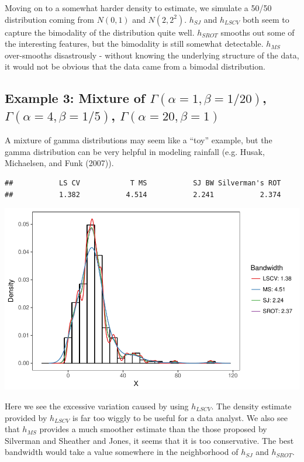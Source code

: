 \documentclass[]{article}
\begin{document}
Moving on to a somewhat harder density to estimate, we simulate a 50/50
distribution coming from \(N(0,1)\) and \(N(2, 2^2)\). \(h_{SJ}\) and
\(h_{LSCV}\) both seem to capture the bimodality of the distribution
quite well. \(h_{SROT}\) smooths out some of the interesting features,
but the bimodality is still somewhat detectable. \(h_{MS}\) over-smooths
disastrously - without knowing the underlying structure of the data, it
would not be obvious that the data came from a bimodal distribution.

\newpage

\subsection{Example 3: Mixture of $\Gamma(\alpha = 1, \beta = 1/20)$, $\Gamma(\alpha = 4, \beta = 1/5)$, $\Gamma(\alpha = 20, \beta = 1)$}

A mixture of gamma distributions may seem like a ``toy'' example, but
the gamma distribution can be very helpful in modeling rainfall (e.g.
Husak, Michaelsen, and Funk (2007)).

\begin{verbatim}
##           LS CV            T MS           SJ BW Silverman's ROT 
##           1.382           4.514           2.241           2.374
\end{verbatim}

\begin{center}\includegraphics{FinalReport_files/figure-latex/unnamed-chunk-8-1} \end{center}

Here we see the excessive variation caused by using \(h_{LSCV}\). The
density estimate provided by \(h_{LSCV}\) is far too wiggly to be useful
for a data analyst. We also see that \(h_{MS}\) provides a much smoother
estimate than the those proposed by Silverman and Sheather and Jones, it
seems that it is too conservative. The best bandwidth would take a value
somewhere in the neighborhood of \(h_{SJ}\) and \(h_{SROT}\).
\end{document}

